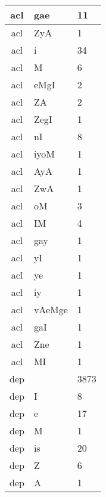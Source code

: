 \documentclass[a4 paper]{article}
\begin{document}
\begin{longtable}{cp{}p{}}
\midrule acl & gae & 11\\ \midrule acl & ZyA & 1\\ \midrule acl & i & 34\\ \midrule acl & M & 6\\ \midrule acl & eMgI & 2\\ \midrule acl & ZA & 2\\ \midrule acl & ZegI & 1\\ \midrule acl & nI & 8\\ \midrule acl & iyoM & 1\\ \midrule acl & AyA & 1\\ \midrule acl & ZwA & 1\\ \midrule acl & oM & 3\\ \midrule acl & IM & 4\\ \midrule acl & gay & 1\\ \midrule acl & yI & 1\\ \midrule acl & ye & 1\\ \midrule acl & iy & 1\\ \midrule acl & vAeMge & 1\\ \midrule acl & gaI & 1\\ \midrule acl & Zne & 1\\ \midrule acl & MI & 1\\ \midrule 
dep &  & 3873\\ \midrule dep & I & 8\\ \midrule dep & e & 17\\ \midrule dep & M & 1\\ \midrule dep & is & 20\\ \midrule dep & Z & 6\\ \midrule dep & A & 1\\ \midrule 

\end{longtable}
\end{document}
